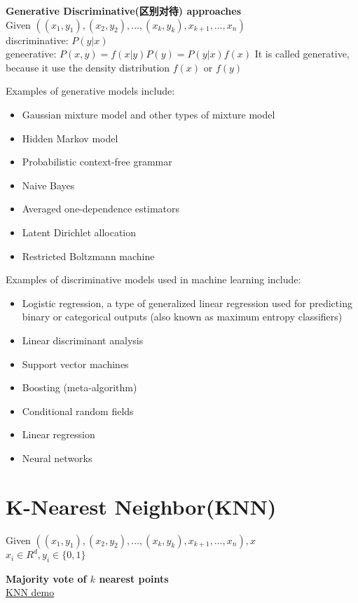 \documentclass{article}
\begin{document}
\begin{itemize}
\begin{itemize}
\textbf{Generative Discriminative(区别对待) approaches}\\
Given $((x_1, y_1), (x_2, y_2), \ldots, (x_k, y_k), x_{k+1}, \ldots, x_n)$\\
discriminative: $P(y|x)$\\
geneerative: $P(x,y) = f(x|y)P(y) = P(y|x)f(x)$
It is called generative, because it use the density distribution $f(x)$ or $f(y)$

Examples of generative models include:
\begin{itemize}
\item Gaussian mixture model and other types of mixture model
\item Hidden Markov model
\item Probabilistic context-free grammar
\item Naive Bayes
\item Averaged one-dependence estimators
\item Latent Dirichlet allocation
\item Restricted Boltzmann machine
\end{itemize}

Examples of discriminative models used in machine learning include:
\begin{itemize}
\item Logistic regression, a type of generalized linear regression used for predicting binary or categorical outputs (also known as maximum entropy classifiers)
\item Linear discriminant analysis
\item Support vector machines
\item Boosting (meta-algorithm)
\item Conditional random fields
\item Linear regression
\item Neural networks
\end{itemize}

\section{K-Nearest Neighbor(KNN)}
Given $((x_1, y_1), (x_2, y_2), \ldots, (x_k, y_k), x_{k+1}, \ldots, x_n), x$\\
$x_i \in R^d, y_i \in \{0, 1\}$

\textbf{Majority vote of $k$ nearest points}\\
\href{http://upload.wikimedia.org/wikipedia/commons/thumb/e/e7/KnnClassification.svg/220px-KnnClassification.svg.png}{KNN demo}


\end{itemize}
\end{itemize}
\end{document}
